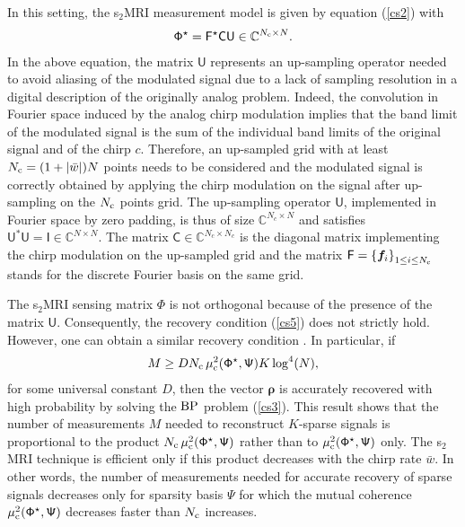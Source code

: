 \documentclass[10pt,draftcls, onecolumn]{IEEEtran}
\begin{document}
In this setting, the s$_2$MRI measurement model is given by equation (\ref{cs2}) with
\begin{eqnarray}
\mathsf{\Phi}^{\star} = \mathsf{F^{\star} CU} \in \mathbb{C}^{N_{\rm c} \times N}.
\end{eqnarray}
In the above equation, the matrix $\mathsf{U}$ represents an up-sampling operator needed to avoid aliasing of the modulated signal due to a lack of sampling resolution in a digital description of the originally analog problem. Indeed, the convolution in Fourier space induced by the analog chirp modulation implies that the band limit of the modulated signal is the sum of the individual band limits of the original signal and of the chirp $c$. Therefore, an up-sampled grid with at least $N_{\rm c}=(1+\vert\bar{w}\vert)N$ points needs to be considered and the modulated signal is correctly obtained by applying the chirp modulation on the signal after up-sampling on the $N_{\rm c}$ points grid. The up-sampling operator $\mathsf{U}$, implemented in Fourier space by zero padding, is thus of size $\mathbb{C}^{N_{c}\times N}$ and satisfies $\mathsf{U}^*\mathsf{U} = \mathsf{I} \in \mathbb{C}^{N \times N}$. The matrix $\mathsf{C} \in \mathbb{C}^{N_{c} \times N_{c}}$ is the diagonal matrix implementing the chirp modulation on the up-sampled grid and the matrix $\mathsf{F} = \left\{\bm{f}_i\right\}_{1 \leq i \leq N_{\rm c}}$ stands for the discrete Fourier basis on the same grid.

The s$_2$MRI sensing matrix $\mathsf{\Phi}$ is not orthogonal because of the presence of the matrix $\mathsf{U}$. Consequently, the recovery condition (\ref{cs5}) does not strictly hold. However, one can obtain a similar recovery condition \cite{puy11a}. In particular, if
\begin{eqnarray}
\label{eq:analog recovery}
M \geq D N_{\rm c} \, \mu_{\rm c}^2(\mathsf{\Phi}^{\star}, \mathsf{\Psi}) K \log^4(N),
\end{eqnarray}
for some universal constant $D$, then the vector $\bm{\rho}$ is accurately recovered with high probability by solving the $\rm BP$ problem (\ref{cs3}). This result shows that the number of measurements $M$ needed to reconstruct $K$-sparse signals is proportional to the product $N_{\rm c} \, \mu_{\rm c}^2(\mathsf{\Phi}^{\star},\mathsf{\Psi})$ rather than to $\mu_{\rm c}^2(\mathsf{\Phi}^{\star},\mathsf{\Psi})$ only. The s$_2$MRI technique is efficient only if this product decreases with the chirp rate $\bar{w}$. In other words, the number of measurements needed for accurate recovery of sparse signals decreases only for sparsity basis $\mathsf{\Psi}$ for which the mutual coherence $\mu_{\rm c}^2(\mathsf{\Phi}^{\star}, \mathsf{\Psi})$ decreases faster than $N_{\rm c}$ increases.
\end{document}
